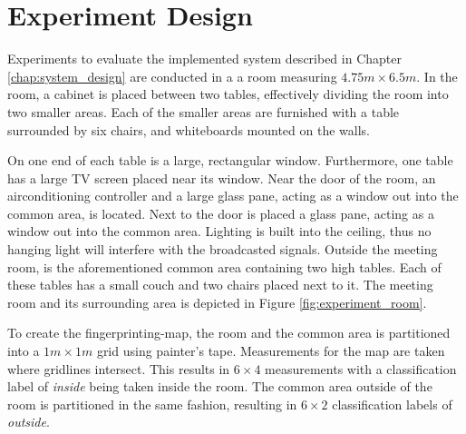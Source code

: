 \section{Experiment Design}\label{sec:experiment_design}
Experiments to evaluate the implemented system described in Chapter \ref{chap:system_design} are conducted in a a room measuring $4.75m \times 6.5m$.
In the room, a cabinet is placed between two tables, effectively dividing the room into two smaller areas. 
Each of the smaller areas are furnished with a table surrounded by six chairs, and whiteboards mounted on the walls.

On one end of each table is a large, rectangular window.
Furthermore, one table has a large TV screen placed near its window. 
Near the door of the room, an airconditioning controller and a large glass pane, acting as a window out into the common area, is located. 
Next to the door is placed a glass pane, acting as a window out into the common area. 
Lighting is built into the ceiling, thus no hanging light will interfere with the broadcasted signals. 
Outside the meeting room, is the aforementioned common area containing two high tables.
Each of these tables has a small couch and two chairs placed next to it.
The meeting room and its surrounding area is depicted in Figure \ref{fig:experiment_room}.

To create the fingerprinting-map, the room and the common area is partitioned into a $1m \times 1m$ grid using painter's tape.
Measurements for the map are taken where gridlines intersect.
This results in $6 \times 4$ measurements with a classification label of \textit{inside} being taken inside the room.
The common area outside of the room is partitioned in the same fashion, resulting in  $6 \times 2$ classification labels of \textit{outside}. 


